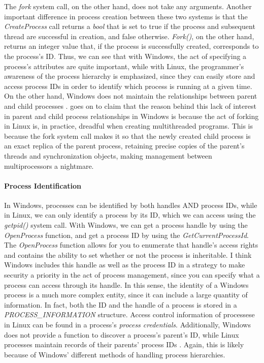 \documentclass[letterpaper,10pt,titlepage]{article}
\begin{document}
The \emph{fork} system call, on the other hand, does not take any arguments. Another important difference in process creation between these two systems is that the \emph{CreateProcess} call returns a \emph{bool} that is set to true if the process and subsequent thread are successful in creation, and false otherwise. \emph{Fork()}, on the other hand, returns an integer value that, if the process is successfully created, corresponds to the process's ID. Thus, we can see that with Windows, the act of specifying a process's attributes are quite important, while with Linux, the programmer's awareness of the process hierarchy is emphasized, since they can easily store and access process IDs in order to identify which process is running at a given time. On the other hand, Windows does not maintain the relationships between parent and child processes \cite{har04}. \cite{har04} goes on to claim that the reason behind this lack of interest in parent and child process relationships in Windows is because the act of forking in Linux is, in practice, dreadful when creating multithreaded programs. This is because the fork system call makes it so that the newly created child process is an exact replica of the parent process, retaining precise copies of the parent's threads and synchronization objects, making management between multiprocessors a nightmare. 
\paragraph{Process Identification} In Windows, processes can be identified by both handles AND process IDs, while in Linux, we can only identify a process by its ID, which we can access using the \emph{getpid()} system call. With Windows, we can get a process handle by using the \emph{OpenProcess} function, and get a process ID by using the \emph{GetCurrentProcessId}. The \emph{OpenProcess} function allows for you to enumerate that handle's access rights and contains the ability to set whether or not the process is inheritable. I think Windows includes this handle as well as the process ID in a strategy to make security a priority in the act of process management, since you can specify what a process can access through its handle. In this sense, the identity of a Windows process is a much more complex entity, since it can include a large quantity of information. In fact, both the ID and the handle of a process is stored in a \emph{PROCESS\_INFORMATION} structure. Access control information of processese in Linux can be found in a process's \emph{process credentials}. Additionally, Windows does not provide a function to discover a process's parent's ID, while Linux processes maintain records of their parents' process IDs \cite{ker10}. Again, this is likely because of Windows' different methods of handling process hierarchies. 
\end{document}
